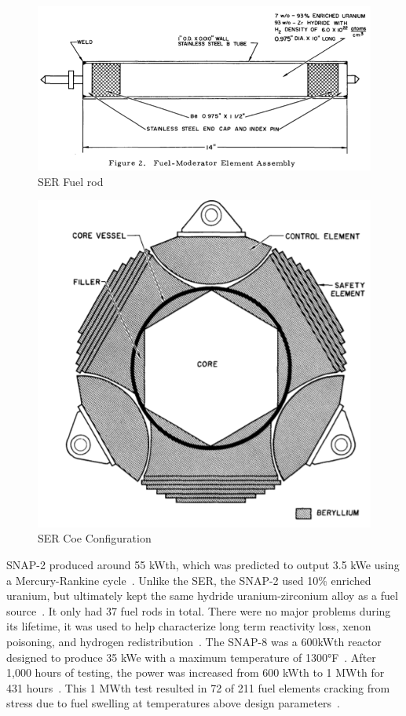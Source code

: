 \documentclass{article}
\begin{document}
\begin{figure}[]
	\centering
	\includegraphics[height=0.35\textheight]{fig/appA}
	\caption[SER Fuel rod]{SER Fuel rod~\cite{lords1994snap}}
	\label{appA}
\end{figure}

\begin{figure}[]
	\centering
	\includegraphics[height=0.45\textheight]{fig/appB}
	\caption[SER Coe Configuration]{SER Coe Configuration~\cite{lords1994snap}}
	\label{appB}
\end{figure}


    SNAP-2 produced around 55 kWth, which was predicted to output 3.5 kWe using a Mercury-Rankine cycle~\cite{voss1984snap}. Unlike the SER, the SNAP-2 used 10\% enriched uranium, but ultimately kept the same hydride uranium-zirconium alloy as a fuel source~\cite{ohlenkamp1966snap}. It only had 37 fuel rods in total. There were no major problems during its lifetime, it was used to help characterize long term reactivity loss, xenon poisoning, and hydrogen redistribution~\cite{voss1984snap}. The SNAP-8 was a 600kWth reactor designed to produce 35 kWe with a maximum temperature of 1300°F~\cite{daye1967snap}. After 1,000 hours of testing, the power was increased from 600 kWth to 1 MWth for 431 hours~\cite{voss1984snap}. This 1 MWth test resulted in 72 of 211 fuel elements cracking from stress due to fuel swelling at temperatures above design parameters~\cite{voss1984snap}. 
\end{document}

